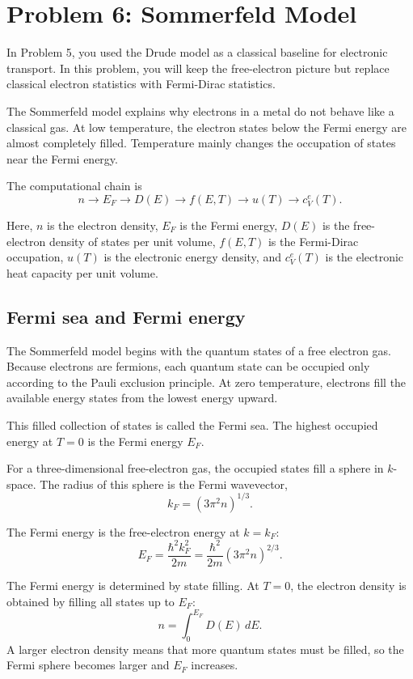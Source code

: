 \section{Problem 6: Sommerfeld Model}

In Problem 5, you used the Drude model as a classical baseline for electronic transport. In this problem, you will keep the free-electron picture but replace classical electron statistics with Fermi-Dirac statistics.

The Sommerfeld model explains why electrons in a metal do not behave like a classical gas. At low temperature, the electron states below the Fermi energy are almost completely filled. Temperature mainly changes the occupation of states near the Fermi energy.

The computational chain is
\[
n
\longrightarrow
E_F
\longrightarrow
D(E)
\longrightarrow
f(E,T)
\longrightarrow
u(T)
\longrightarrow
c_V^{e}(T).
\]

Here, \(n\) is the electron density, \(E_F\) is the Fermi energy, \(D(E)\) is the free-electron density of states per unit volume, \(f(E,T)\) is the Fermi-Dirac occupation, \(u(T)\) is the electronic energy density, and \(c_V^{e}(T)\) is the electronic heat capacity per unit volume.

\subsection{Fermi sea and Fermi energy}

The Sommerfeld model begins with the quantum states of a free electron gas. Because electrons are fermions, each quantum state can be occupied only according to the Pauli exclusion principle. At zero temperature, electrons fill the available energy states from the lowest energy upward.

This filled collection of states is called the Fermi sea. The highest occupied energy at \(T=0\) is the Fermi energy \(E_F\).

For a three-dimensional free-electron gas, the occupied states fill a sphere in \(k\)-space. The radius of this sphere is the Fermi wavevector,
\[
k_F=(3\pi^2n)^{1/3}.
\]

The Fermi energy is the free-electron energy at \(k=k_F\):
\[
E_F=\frac{\hbar^2k_F^2}{2m}
=
\frac{\hbar^2}{2m}(3\pi^2n)^{2/3}.
\]

The Fermi energy is determined by state filling. At \(T=0\), the electron density is obtained by filling all states up to \(E_F\):
\[
n=\int_0^{E_F}D(E)\,dE.
\]
A larger electron density means that more quantum states must be filled, so the Fermi sphere becomes larger and \(E_F\) increases.

